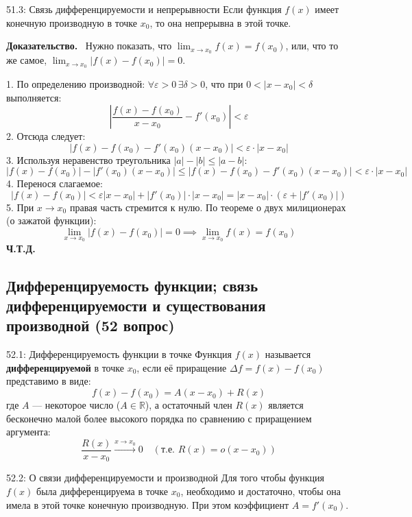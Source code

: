 \documentclass[a4paper,12pt]{article}
\newcommand{\myproof}{\textbf{Доказательство.}\ }
\begin{document}
	
	\vspace{1cm}
	\begin{theorembox}{51.3: Связь дифференцируемости и непрерывности}
		Если функция $f(x)$ имеет конечную производную в точке $x_0$, то она непрерывна в этой точке.
	\end{theorembox}
	
	\vspace{0.5cm}
	\myproof
	Нужно показать, что $\lim_{x \to x_0} f(x) = f(x_0)$, или, что то же самое, $\lim_{x \to x_0} |f(x) - f(x_0)| = 0$.
	
	1. По определению производной: $\forall \varepsilon > 0 \, \exists \delta > 0$, что при $0 < |x - x_0| < \delta$ выполняется:
	$$ \left| \frac{f(x) - f(x_0)}{x - x_0} - f'(x_0) \right| < \varepsilon $$
	2. Отсюда следует:
	$$ |f(x) - f(x_0) - f'(x_0)(x - x_0)| < \varepsilon \cdot |x - x_0| $$
	3. Используя неравенство треугольника $|a| - |b| \leq |a - b|$:
	$$ |f(x) - f(x_0)| - |f'(x_0)(x - x_0)| \leq |f(x) - f(x_0) - f'(x_0)(x - x_0)| < \varepsilon \cdot |x - x_0| $$
	4. Перенося слагаемое:
	$$ |f(x) - f(x_0)| < \varepsilon |x - x_0| + |f'(x_0)| \cdot |x - x_0| = |x - x_0| \cdot (\varepsilon + |f'(x_0)|) $$
	5. При $x \to x_0$ правая часть стремится к нулю. По теореме о двух милиционерах (о зажатой функции):
	$$ \lim_{x \to x_0} |f(x) - f(x_0)| = 0 \implies \lim_{x \to x_0} f(x) = f(x_0) $$
	\textbf{Ч.Т.Д.}
	
	
	
	
	
	
	\newpage
	\subsection{Дифференцируемость функции; связь дифференцируемости и существования производной (52 вопрос)}
	
	\begin{definitionbox}{52.1: Дифференцируемость функции в точке}
		Функция $f(x)$ называется \textbf{дифференцируемой} в точке $x_0$, если её приращение $\Delta f = f(x) - f(x_0)$ представимо в виде:
		$$ f(x) - f(x_0) = A(x - x_0) + R(x) $$
		где $A$ — некоторое число ($A \in \mathbb{R}$), а остаточный член $R(x)$ является бесконечно малой более высокого порядка по сравнению с приращением аргумента:
		$$ \frac{R(x)}{x - x_0} \xrightarrow{x \to x_0} 0 \quad (\text{т.е. } R(x) = o(x - x_0)) $$
	\end{definitionbox}
	
	\begin{theorembox}{52.2: О связи дифференцируемости и производной}
		Для того чтобы функция $f(x)$ была дифференцируема в точке $x_0$, необходимо и достаточно, чтобы она имела в этой точке конечную производную. При этом коэффициент $A = f'(x_0)$.
	\end{theorembox}
	
\end{document}
